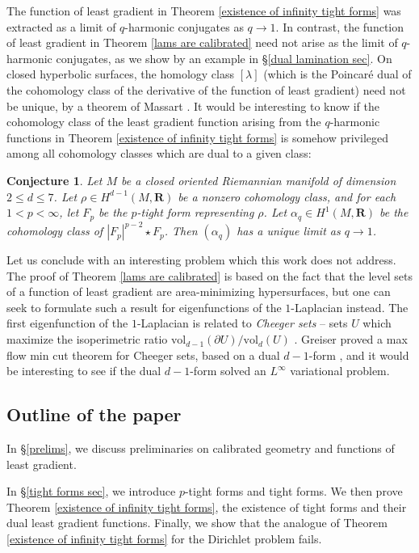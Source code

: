 \documentclass[reqno,11pt]{amsart}
\newcommand{\RR}{\mathbf{R}}
\newcommand{\vol}{\mathrm{vol}}
\newcommand{\dfn}[1]{\emph{#1}\index{#1}}
\newtheorem{conjecture}[theorem]{Conjecture}
\theoremstyle{definition}
\numberwithin{equation}{section}
\begin{document}
The function of least gradient in Theorem \ref{existence of infinity tight forms} was extracted as a limit of $q$-harmonic conjugates as $q \to 1$.
In contrast, the function of least gradient in Theorem \ref{lams are calibrated} need not arise as the limit of $q$-harmonic conjugates, as we show by an example in \S\ref{dual lamination sec}.
On closed hyperbolic surfaces, the homology class $[\lambda]$ (which is the Poincar\'e dual of the cohomology class of the derivative of the function of least gradient) need not be unique, by a theorem of Massart \cite{Massart1997StableNO}.
It would be interesting to know if the cohomology class of the least gradient function arising from the $q$-harmonic functions in Theorem \ref{existence of infinity tight forms} is somehow privileged among all cohomology classes which are dual to a given class:

\begin{conjecture}
Let $M$ be a closed oriented Riemannian manifold of dimension $2 \leq d \leq 7$.
Let $\rho \in H^{d - 1}(M, \RR)$ be a nonzero cohomology class, and for each $1 < p < \infty$, let $F_p$ be the $p$-tight form representing $\rho$.
Let $\alpha_q \in H^1(M, \RR)$ be the cohomology class of $|F_p|^{p - 2} \star F_p$.
Then $(\alpha_q)$ has a unique limit as $q \to 1$.
\end{conjecture}

Let us conclude with an interesting problem which this work does not address.
The proof of Theorem \ref{lams are calibrated} is based on the fact that the level sets of a function of least gradient are area-minimizing hypersurfaces, but one can seek to formulate such a result for eigenfunctions of the $1$-Laplacian instead.
The first eigenfunction of the $1$-Laplacian is related to \dfn{Cheeger sets} -- sets $U$ which maximize the isoperimetric ratio $\vol_{d - 1}(\partial U)/\vol_d(U)$ \cite{Kawohl2003}.
Greiser proved a max flow min cut theorem for Cheeger sets, based on a dual $d - 1$-form \cite{Grieser05}, and it would be interesting to see if the dual $d - 1$-form solved an $L^\infty$ variational problem.


\subsection{Outline of the paper}
In \S\ref{prelims}, we discuss preliminaries on calibrated geometry and functions of least gradient.

In \S\ref{tight forms sec}, we introduce $p$-tight forms and tight forms.
We then prove Theorem \ref{existence of infinity tight forms}, the existence of tight forms and their dual least gradient functions.
Finally, we show that the analogue of Theorem \ref{existence of infinity tight forms} for the Dirichlet problem fails.
\end{document}
